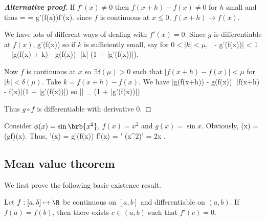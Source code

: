 \begin{proof}[\bf Alternative proof]
If $f'(x) \neq 0$ then $f(x+h) - f(x) \neq 0$ for $h$ small and thus
\be
{} =  \cdot {}  = g'(f(x))\cdot f'(x).
\ee
since $f$ is continuous at $x \leq 0$, $f(x+h) \rightarrow f(x)$.

We have lots of different ways of dealing with $f'(x) = 0$. %
Since $g$ is differentiable at $f(x)$,
\be
{} \rightarrow g'(f(x))
\ee
so if $k$ is sufficiently small, say for $0 < |k| < \mu$,
\be
\Big| - g'(f(x))\Big| < 1 \ \ra \ |g(f(x) + k) - g(f(x))| \leq |k| (1 + |g'(f(x))|).
\ee

Now $f$ is continuous at $x$ so $\exists \delta(\mu) > 0$ such that $|f(x+h) - f(x)| < \mu$ for $|h| < \delta(\mu)$. Take $k = f(x+h) - f(x)$. We have
\be
|g(f(x+h)) - g(f(x))| \leq |f(x+h) - f(x)|(1 + |g'(f(x))|)
\ee
so
\be
\Big|\Big| \leq {}_{} (1 + |g'(f(x))|)
\ee

Thus $g \circ f$ is differentiable with derivative 0.
\end{proof}

\begin{example}
Consider $\phi(x)=\sin \brb{x^2}$, $ f(x)=x^2$ and $g(x)=\sin x$. Obviously,
\be
\phi(x) = (g\circ f)(x).
\ee
Thus,
\be
\phi'(x) = g'(f(x)) f'(x) = ' \cdot (x^2)' = 2x \cos{}.
\ee
\end{example}



\subsection{Mean value theorem}

We first prove the following basic existence result.

\begin{theorem}\label{thm:rolle_analysis}
Let $f: [a,b]\mapsto \R$ be continuous on $[a,b]$ and differentiable on $(a,b)$. If $f(a)=f(b)$, then there exists $c\in (a,b)$ such that $f'(c)=0$.
\end{theorem}

